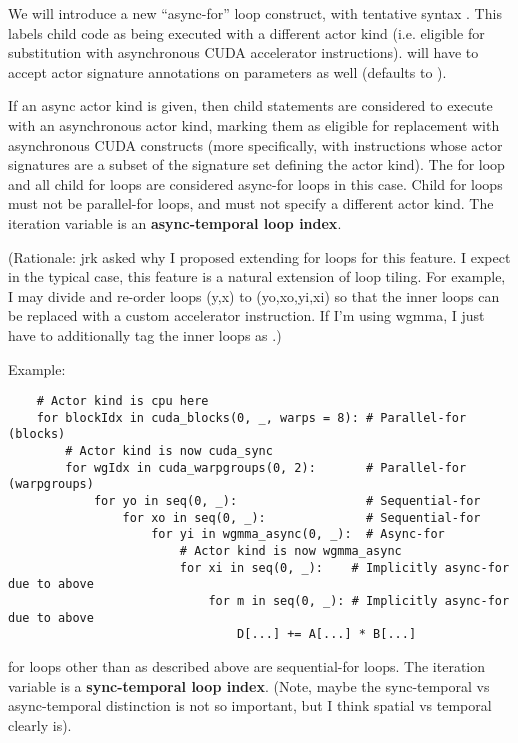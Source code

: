 \filbreak
{} We will introduce a new ``async-for'' loop construct, with tentative syntax .
This labels child code as being executed with a different actor kind (i.e. eligible for substitution with asynchronous CUDA accelerator instructions).
 will have to accept actor signature annotations on parameters as well (defaults to ).

If an async actor kind is given, then child statements are considered to execute with an asynchronous actor kind, marking them as eligible for replacement with asynchronous CUDA constructs (more specifically, with instructions whose actor signatures are a subset of the signature set defining the actor kind).
The for loop and all child for loops are considered async-for loops in this case.
Child for loops must not be parallel-for loops, and must not specify a different actor kind.
The iteration variable is an \textbf{async-temporal loop index}.

\filbreak
(Rationale: jrk asked why I proposed extending for loops for this feature.
I expect in the typical case, this feature is a natural extension of loop tiling.
For example, I may divide and re-order loops (y,x) to (yo,xo,yi,xi) so that the inner loops can be replaced with a custom accelerator instruction.
If I'm using wgmma, I just have to additionally tag the inner loops as .)

\filbreak
Example:
{\color{lightttColor}
\begin{verbatim}
    # Actor kind is cpu here
    for blockIdx in cuda_blocks(0, _, warps = 8): # Parallel-for (blocks)
        # Actor kind is now cuda_sync
        for wgIdx in cuda_warpgroups(0, 2):       # Parallel-for (warpgroups)
            for yo in seq(0, _):                  # Sequential-for
                for xo in seq(0, _):              # Sequential-for
                    for yi in wgmma_async(0, _):  # Async-for
                        # Actor kind is now wgmma_async
                        for xi in seq(0, _):    # Implicitly async-for due to above
                            for m in seq(0, _): # Implicitly async-for due to above
                                D[...] += A[...] * B[...]
\end{verbatim}
}

\filbreak
{} for loops other than as described above are sequential-for loops.
The iteration variable is a \textbf{sync-temporal loop index}.
(Note, maybe the sync-temporal vs async-temporal distinction is not so important, but I think spatial vs temporal clearly is).

